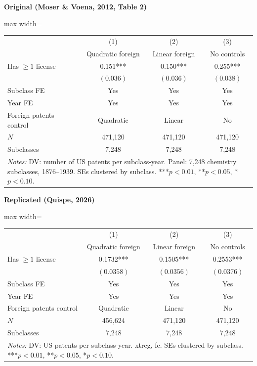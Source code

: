 \documentclass[11pt,a4paper]{article}
\begin{document}
\vspace{0.5cm}
\begin{minipage}[t]{0.48\textwidth}
\centering
\textbf{\large Original (Moser \& Voena, 2012, Table 2)}
\vspace{0.3cm}

\begin{adjustbox}{max width=\textwidth}
\begin{tabular}{lccc}
\toprule
 & (1) & (2) & (3) \\
 & Quadratic foreign & Linear foreign & No controls \\
\midrule
Has $\geq 1$ license & 0.151*** & 0.150*** & 0.255*** \\
 & $(0.036)$ & $(0.036)$ & $(0.038)$ \\[0.3em]
\midrule
Subclass FE & Yes & Yes & Yes \\
Year FE & Yes & Yes & Yes \\
Foreign patents control & Quadratic & Linear & No \\
$N$ & 471,120 & 471,120 & 471,120 \\
Subclasses & 7,248 & 7,248 & 7,248 \\
\bottomrule
\multicolumn{4}{p{0.95\textwidth}}{\footnotesize\textit{Notes:} DV: number of US patents per subclass-year. Panel: 7,248 chemistry subclasses, 1876--1939. SEs clustered by subclass. ***$p<0.01$, **$p<0.05$, *$p<0.10$.}
\end{tabular}
\end{adjustbox}
\end{minipage}%
\hfill
\begin{minipage}[t]{0.48\textwidth}
\centering
\textbf{\large Replicated (Quispe, 2026)}
\vspace{0.3cm}

\begin{adjustbox}{max width=\textwidth}
\begin{tabular}{lccc}
\toprule
 & (1) & (2) & (3) \\
 & Quadratic foreign & Linear foreign & No controls \\
\midrule
Has $\geq 1$ license & 0.1732*** & 0.1505*** & 0.2553*** \\
 & $(0.0358)$ & $(0.0356)$ & $(0.0376)$ \\[0.3em]
\midrule
Subclass FE & Yes & Yes & Yes \\
Year FE & Yes & Yes & Yes \\
Foreign patents control & Quadratic & Linear & No \\
$N$ & 456,624 & 471,120 & 471,120 \\
Subclasses & 7,248 & 7,248 & 7,248 \\
\bottomrule
\multicolumn{4}{p{0.95\textwidth}}{\footnotesize\textit{Notes:} DV: US patents per subclass-year. xtreg, fe. SEs clustered by subclass. ***$p<0.01$, **$p<0.05$, *$p<0.10$.}
\end{tabular}
\end{adjustbox}
\end{minipage}
\end{document}
